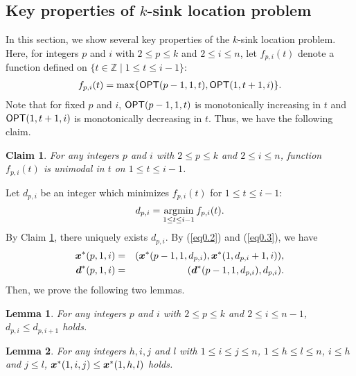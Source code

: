 \documentclass[a4paper]{llncs}
\newcommand{\bm}[1]{\mbox{\boldmath{$#1$}}}
\newcommand{\argmin}{\operatornamewithlimits{argmin}}
\newtheorem{lem}{Lemma}
\newtheorem{clm}{Claim}
\begin{document}
\subsection{Key properties of $k$-sink location problem}
\label{sec:mmkp}
In this section, we show several key properties of the $k$-sink location problem.
Here, 
for integers $p$ and $i$ with $2 \le p \le k$ and $2 \le i \le n$, 
let $f_{p, i}(t)$ denote a function defined on $\{ t \in \mathbb{Z} \mid 1 \le t \le i-1 \}$:
\begin{eqnarray}
f_{p, i}(t) = \max \{ {\sf OPT}(p-1, 1, t), {\sf OPT}(1, t+1, i) \}.
\label{eq1}
\end{eqnarray}
Note that for fixed $p$ and $i$, ${\sf OPT}(p-1, 1, t)$ is monotonically increasing in $t$ and ${\sf OPT}(1, t+1, i)$ is monotonically decreasing in $t$.
Thus, we have the following claim.
\begin{clm}
For any integers $p$ and $i$ with $2 \le p \le k$ and $2 \le i \le n$,
function $f_{p, i}(t)$ is unimodal in $t$ on $1 \le t \le i-1$.
\label{clm1}
\end{clm}
Let $d_{p, i}$ be an integer which minimizes $f_{p, i}(t)$ for $1 \le t \le i-1$:
\begin{eqnarray}
d_{p, i} = \argmin_{1 \le t \le i-1} f_{p, i}(t).
\label{eq1.1}
\end{eqnarray}
By Claim \ref{clm1}, there uniquely exists $d_{p, i}$.
By (\ref{eq0.2}) and (\ref{eq0.3}), we have
\begin{eqnarray}
{\bm x}^*(p, 1, i) &=& ({\bm x}^*(p-1, 1, d_{p, i}), {\bm x}^*(1, d_{p, i} + 1, i)), \label{eq2.1} \\
{\bm d}^*(p, 1, i) &=& ({\bm d}^*(p-1, 1, d_{p, i}), d_{p, i}). \label{eq2.2}
\end{eqnarray}
Then, we prove the following two lemmas.
\begin{lem}
For any integers $p$ and $i$ with $2 \le p \le k$ and $2 \le i \le n-1$,
$d_{p, i} \le d_{p, i+1}$ holds.
\label{lem1}
\end{lem}

\begin{lem}
For any integers $h, i, j$ and $l$ with $1 \le i \le j \le n$, $1 \le h \le l \le n$, $i \le h$ and $j \le l$,
${\bm x}^*(1, i, j) \le {\bm x}^*(1, h, l)$ holds.
\label{lem2}
\end{lem}
\end{document}
